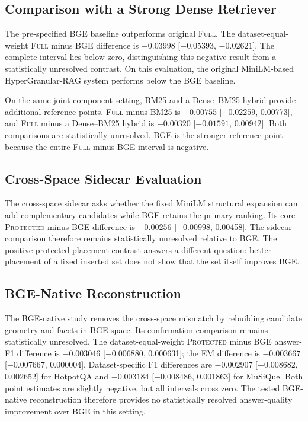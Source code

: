 \documentclass[11pt]{article}
\newcommand{\hgrag}{HyperGranular-RAG\xspace}
\newcommand{\full}{\textsc{Full}\xspace}
\newcommand{\prot}{\textsc{Protected}\xspace}
\begin{document}
\subsection{Comparison with a Strong Dense Retriever}

The pre-specified BGE baseline outperforms original \full. The
dataset-equal-weight \full minus BGE difference is
$-0.03998$ [$-0.05393$, $-0.02621$]. The complete interval lies below zero,
distinguishing this negative result from a statistically unresolved contrast.
On this evaluation, the original MiniLM-based \hgrag system performs below the
BGE baseline.

On the same joint component setting, BM25 and a Dense--BM25 hybrid provide
additional reference points.
\full minus BM25 is $-0.00755$ [$-0.02259$, 0.00773], and \full minus a
Dense--BM25 hybrid is $-0.00320$ [$-0.01591$, 0.00942]. Both comparisons are
statistically unresolved. BGE is the stronger reference point because the
entire \full-minus-BGE interval is negative.

\subsection{Cross-Space Sidecar Evaluation}

The cross-space sidecar asks whether the fixed MiniLM structural expansion can
add complementary candidates while BGE retains the primary ranking. Its core
\prot minus BGE difference is $-0.00256$ [$-0.00998$, 0.00458].
The sidecar comparison therefore remains statistically unresolved relative to
BGE. The positive protected-placement contrast answers a different question:
better placement of a fixed inserted set does not show that the set itself
improves BGE.

\subsection{BGE-Native Reconstruction}

The BGE-native study removes the cross-space mismatch by rebuilding candidate
geometry and facets in BGE space. Its confirmation comparison remains
statistically unresolved. The
dataset-equal-weight \prot minus BGE answer-F1 difference is
$-0.003046$ [$-0.006880$, 0.000631]; the EM difference is
$-0.003667$ [$-0.007667$, 0.000004]. Dataset-specific F1 differences are
$-0.002907$ [$-0.008682$, 0.002652] for HotpotQA and
$-0.003184$ [$-0.008486$, 0.001863] for MuSiQue. Both point estimates are
slightly negative, but all intervals cross zero. The tested BGE-native
reconstruction therefore provides no statistically resolved answer-quality
improvement over BGE in this setting.
\end{document}
